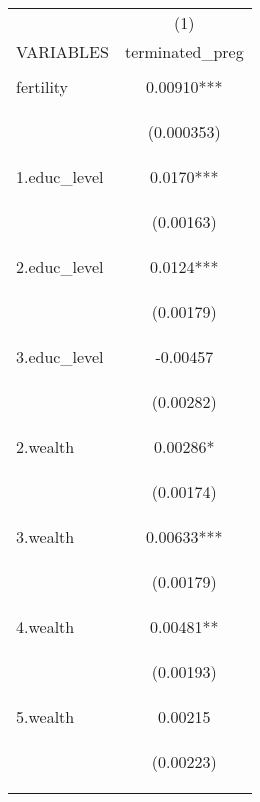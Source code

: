 \documentclass[]{article}
\begin{document}
\begin{center}
\begin{tabular}{lc} \hline
 & (1) \\
VARIABLES & terminated\_preg \\ \hline
\vspace{4pt} & \begin{footnotesize}\end{footnotesize} \\
fertility & 0.00910*** \\
\vspace{4pt} & \begin{footnotesize}(0.000353)\end{footnotesize} \\
1.educ\_level & 0.0170*** \\
\vspace{4pt} & \begin{footnotesize}(0.00163)\end{footnotesize} \\
2.educ\_level & 0.0124*** \\
\vspace{4pt} & \begin{footnotesize}(0.00179)\end{footnotesize} \\
3.educ\_level & -0.00457 \\
\vspace{4pt} & \begin{footnotesize}(0.00282)\end{footnotesize} \\
2.wealth & 0.00286* \\
\vspace{4pt} & \begin{footnotesize}(0.00174)\end{footnotesize} \\
3.wealth & 0.00633*** \\
\vspace{4pt} & \begin{footnotesize}(0.00179)\end{footnotesize} \\
4.wealth & 0.00481** \\
\vspace{4pt} & \begin{footnotesize}(0.00193)\end{footnotesize} \\
5.wealth & 0.00215 \\
\vspace{4pt} & \begin{footnotesize}(0.00223)\end{footnotesize} \\

\end{tabular}
\end{center}
\end{document}
